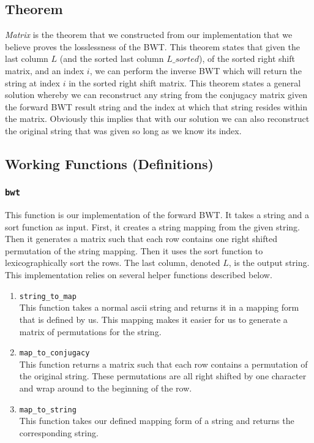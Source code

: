 \documentclass[11pt,letterpaper,]{article}
\begin{document}
\subsection{Theorem}

\emph{Matrix} is the theorem that we constructed from our implementation that
we believe proves the losslessness of the BWT. This theorem states that given
the last column $L$ (and the sorted last column $L\_sorted$), of the sorted
right shift matrix, and an index $i$, we can perform the inverse BWT which will
return the string at index $i$ in the sorted right shift matrix. This theorem
states a general solution whereby we can reconstruct any string from the
conjugacy matrix given the forward BWT result string and the index at which
that string resides within the matrix. Obviously this implies that with our
solution we can also reconstruct the original string that was given so long as
we know its index.

\subsection{Working Functions (Definitions)}

\subsubsection{\texttt{bwt}}

This function is our implementation of the forward BWT. It takes a string and a
sort function as input. First, it creates a string mapping from the given
string. Then it generates a matrix such that each row contains one right
shifted permutation of the string mapping. Then it uses the sort function to
lexicographically sort the rows. The last column, denoted $L$, is the output
string. This implementation relies on several helper functions described below.

\begin{enumerate}
    \item \verb|string_to_map|\\
        This function takes a normal ascii string and returns it in a mapping
        form that is defined by us. This mapping makes it easier for us to
        generate a matrix of permutations for the string.
    \item \verb|map_to_conjugacy|\\
        This function returns a matrix such that each row contains a
        permutation of the original string. These permutations are all right
        shifted by one character and wrap around to the beginning of the row.
    \item \verb|map_to_string|\\
        This function takes our defined mapping form of a string and returns
        the corresponding string.
\end{enumerate}
\end{document}
